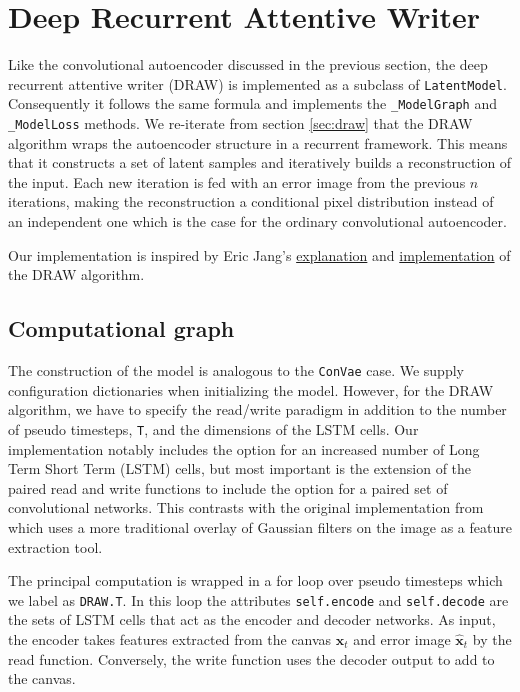 
\section{Deep Recurrent Attentive Writer}\label{sec:draw_implement}

Like the convolutional autoencoder discussed in the previous section, the deep recurrent attentive writer (DRAW) is implemented as a subclass of \lstinline{LatentModel}. Consequently it follows the same formula and implements the  \lstinline{_ModelGraph} and \lstinline{_ModelLoss} methods. We re-iterate from section \ref{sec:draw} that the  DRAW algorithm wraps the autoencoder structure in a recurrent framework. This means that it constructs a set of latent samples and iteratively builds a reconstruction of the input. Each new iteration is fed with an error image from the previous $n$ iterations, making the reconstruction a conditional pixel distribution instead of an independent one which is the case for the ordinary convolutional autoencoder. 

Our implementation is inspired by Eric Jang's \href{https://blog.evjang.com/2016/06/understanding-and-implementing.html}{explanation} and \href{https://GitHub.com/ericjang/draw}{implementation} of the DRAW algorithm.

\subsection{Computational graph}

The construction of the model is analogous to the \lstinline{ConVae} case. We supply configuration dictionaries when initializing the model. However, for the DRAW algorithm, we have to specify the read/write paradigm in addition to the number of pseudo timesteps, \lstinline{T}, and the dimensions of the LSTM cells.  Our implementation notably includes the option for an increased number of  Long Term Short Term (LSTM) cells, but most important is the extension of the paired read and write functions to include the option for a paired set of convolutional networks. This contrasts with the original implementation from \citet{Gregor2015} which uses a more traditional overlay of Gaussian filters on the image as a feature extraction tool. 

The principal computation is wrapped in a for loop over pseudo timesteps which we label as \lstinline{DRAW.T}. In this loop the attributes \lstinline{self.encode} and \lstinline{self.decode} are the sets of LSTM cells that act as the encoder and decoder networks. As input, the encoder takes features extracted from the canvas $\boldsymbol{x}_t$ and error image $\boldsymbol{\hat{x}}_t$ by the read function. Conversely, the write function uses the decoder output to add to the canvas. 

